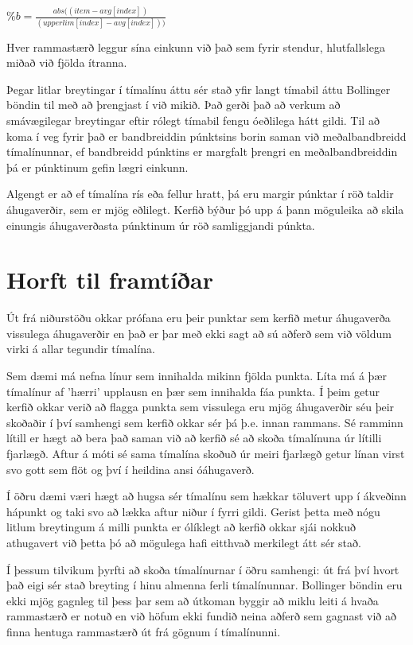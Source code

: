 \documentclass{article}
\begin{document}
\begin{center}
  $\%b=\frac{abs((item - avg[index])}{(upperlim[index] - avg[index]))}$
\end{center}


Hver rammastærð leggur sína einkunn við það sem fyrir stendur, hlutfallslega miðað við fjölda ítranna.

Þegar litlar breytingar í tímalínu áttu sér stað yfir langt tímabil áttu Bollinger böndin til með að 
þrengjast í við mikið. Það gerði það að verkum að smávægilegar breytingar eftir rólegt tímabil fengu
óeðlilega hátt gildi. Til að koma í veg fyrir það er bandbreiddin púnktsins borin saman við meðalbandbreidd
tímalínunnar, ef bandbreidd púnktins er margfalt þrengri en meðalbandbreiddin þá er púnktinum gefin lægri einkunn. 

Algengt er að ef tímalína rís eða fellur hratt, þá eru margir púnktar í röð taldir áhugaverðir, sem er mjög eðlilegt.
Kerfið býður þó upp á þann möguleika að skila einungis áhugaverðasta púnktinum úr röð samliggjandi púnkta.


\section{Horft til framtíðar}
Út frá niðurstöðu okkar prófana eru þeir punktar sem kerfið metur
áhugaverða vissulega áhugaverðir en það er þar með ekki sagt að
sú aðferð sem við völdum virki á allar tegundir tímalína. 

Sem dæmi má nefna línur sem innihalda mikinn fjölda punkta.
Líta má á þær tímalínur af 'hærri' upplausn en þær sem innihalda fáa punkta. Í
þeim getur kerfið okkar verið að flagga punkta sem vissulega eru mjög
áhugaverðir séu þeir skoðaðir í því samhengi sem kerfið okkar sér þá þ.e. innan
rammans. Sé ramminn lítill er hægt að bera það saman við að kerfið sé að skoða
tímalínuna úr lítilli fjarlægð. Aftur á móti sé sama tímalína skoðuð úr meiri
fjarlægð getur línan virst svo gott sem flöt og því í heildina ansi óáhugaverð.

Í öðru dæmi væri hægt að hugsa sér tímalínu sem hækkar töluvert upp í ákveðinn
hápunkt og taki svo að lækka aftur niður í fyrri gildi. Gerist þetta með nógu
litlum breytingum á milli punkta er ólíklegt að kerfið okkar sjái nokkuð
athugavert við þetta þó að mögulega hafi eitthvað merkilegt átt sér stað. 

Í þessum tilvikum þyrfti að skoða tímalínurnar í öðru samhengi: út frá því hvort
það eigi sér stað breyting í hinu almenna ferli tímalínunnar. Bollinger böndin
eru ekki mjög gagnleg til þess þar sem að útkoman byggir að miklu leiti á hvaða
rammastærð er notuð en við höfum ekki fundið neina aðferð sem gagnast við að
finna hentuga rammastærð út frá gögnum í tímalínunni.
\end{document}
